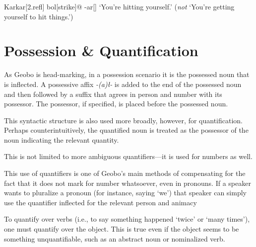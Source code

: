 \documentclass[a4paper,11pt,oneside,openany]{memoir}
\begin{document}
\ex
\begingl
Karkar[\sc 2.refl]
bol[strike]@
-ar[]
\glft  `You're hitting yourself.' (\emph{not} `You're getting yourself to hit things.')
\endgl
\xe

\section{Possession \& Quantification}

As Geobo{\engma} is head-marking, in a possession scenario it is the possessed noun that is inflected. A possessive affix \textit{-(a)\l-} is added to the end of the possessed noun and then followed by a suffix that agrees in person and number with its possessor. The possessor, if specified, is placed before the possessed noun.


This syntactic structure is also used more broadly, however, for quantification. Perhaps counterintuitively, the quantified noun is treated as the possessor of the noun indicating the relevant quantity.


This is not limited to more ambiguous quantifiers---it is used for numbers as well.


This use of quantifiers is one of Geobo{\engma}'s main methods of compensating for the fact that it does not mark for number whatsoever, even in pronouns. If a speaker wants to pluralize a pronoun (for instance, saying `we') that speaker can simply use the quantifier inflected for the relevant person and animacy 

To quantify over verbs (i.e., to say something happened `twice' or `many times'), one must quantify over the object. This is true even if the object seems to be something unquantifiable, such as an abstract noun or nominalized verb.

\end{document}
